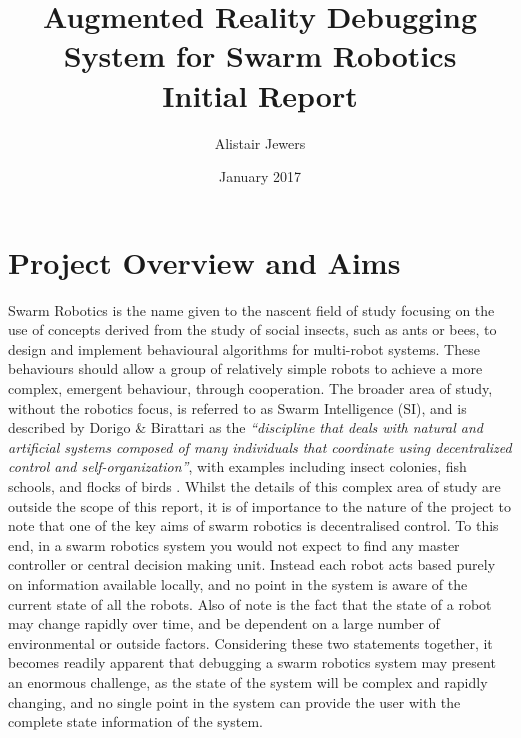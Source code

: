 \documentclass[titlepage,hidelinks,10pt]{article}
\date{January 2017}
\title{Augmented Reality Debugging System for Swarm Robotics \vspace{1cm}\\\Large{Initial Report}}
\author{Alistair Jewers}
\begin{document}
\maketitle

\tableofcontents
\newpage

\section{Project Overview and Aims} \label{Overview}
Swarm Robotics is the name given to the nascent field of study focusing on the use of concepts derived from the study of social insects, such as ants or bees, to design and implement behavioural algorithms for multi-robot systems. These behaviours should allow a group of relatively simple robots to achieve a more complex, emergent behaviour, through cooperation\cite{InspirationToApplication}. The broader area of study, without the robotics focus, is referred to as Swarm Intelligence (SI), and is described by Dorigo \& Birattari as the \textit{``discipline that deals with natural and artificial systems composed of many individuals that coordinate using decentralized control and self-organization''}, with examples including insect colonies, fish schools, and flocks of birds \cite{SwarmIntelligence}. Whilst the details of this complex area of study are outside the scope of this report, it is of importance to the nature of the project to note that one of the key aims of swarm robotics is decentralised control. To this end, in a swarm robotics system you would not expect to find any master controller or central decision making unit. Instead each robot acts based purely on information available locally, and no point in the system is aware of the current state of all the robots. Also of note is the fact that the state of a robot may change rapidly over time, and be dependent on a large number of environmental or outside factors. Considering these two statements together, it becomes readily apparent that debugging a swarm robotics system may present an enormous challenge, as the state of the system will be complex and rapidly changing, and no single point in the system can provide the user with the complete state information of the system. 
\end{document}
